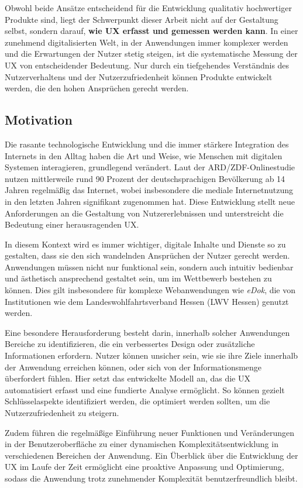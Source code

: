 \documentclass[12pt,oneside]{article}
\begin{document}
Obwohl beide Ansätze entscheidend für die Entwicklung qualitativ hochwertiger Produkte sind, liegt der Schwerpunkt dieser Arbeit nicht auf der Gestaltung selbst, sondern darauf, \textbf{wie UX erfasst und gemessen werden kann}. In einer zunehmend digitalisierten Welt, in der Anwendungen immer komplexer werden und die Erwartungen der Nutzer stetig steigen, ist die systematische Messung der UX von entscheidender Bedeutung. Nur durch ein tiefgehendes Verständnis des Nutzerverhaltens und der Nutzerzufriedenheit können Produkte entwickelt werden, die den hohen Ansprüchen gerecht werden.

\subsection{Motivation}

Die rasante technologische Entwicklung und die immer stärkere Integration des Internets in den Alltag haben die Art und Weise, wie Menschen mit digitalen Systemen interagieren, grundlegend verändert. Laut der ARD/ZDF-Onlinestudie \cite{ard} nutzen mittlerweile rund 90 Prozent der deutschsprachigen Bevölkerung ab 14 Jahren regelmäßig das Internet, wobei insbesondere die mediale Internetnutzung in den letzten Jahren signifikant zugenommen hat. Diese Entwicklung stellt neue Anforderungen an die Gestaltung von Nutzererlebnissen und unterstreicht die Bedeutung einer herausragenden UX.

In diesem Kontext wird es immer wichtiger, digitale Inhalte und Dienste so zu gestalten, dass sie den sich wandelnden Ansprüchen der Nutzer gerecht werden. Anwendungen müssen nicht nur funktional sein, sondern auch intuitiv bedienbar und ästhetisch ansprechend gestaltet sein, um im Wettbewerb bestehen zu können. Dies gilt insbesondere für komplexe Webanwendungen wie \textit{eDok}, die von Institutionen wie dem Landeswohlfahrtsverband Hessen (LWV Hessen) genutzt werden.

Eine besondere Herausforderung besteht darin, innerhalb solcher Anwendungen Bereiche zu identifizieren, die ein verbessertes Design oder zusätzliche Informationen erfordern. Nutzer können unsicher sein, wie sie ihre Ziele innerhalb der Anwendung erreichen können, oder sich von der Informationsmenge überfordert fühlen. Hier setzt das entwickelte Modell an, das die UX automatisiert erfasst und eine fundierte Analyse ermöglicht. So können gezielt Schlüsselaspekte identifiziert werden, die optimiert werden sollten, um die Nutzerzufriedenheit zu steigern.

Zudem führen die regelmäßige Einführung neuer Funktionen und Veränderungen in der Benutzeroberfläche zu einer dynamischen Komplexitätsentwicklung in verschiedenen Bereichen der Anwendung. Ein Überblick über die Entwicklung der UX im Laufe der Zeit ermöglicht eine proaktive Anpassung und Optimierung, sodass die Anwendung trotz zunehmender Komplexität benutzerfreundlich bleibt.
\end{document}
